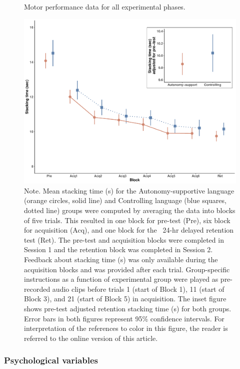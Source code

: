 \documentclass[doc,floatsintext,donotrepeattitle,letterpaper,12pt]{apa7}
\begin{document}
\begin{figure}[htbp]
    \caption{Motor performance data for all experimental phases.}
    \centering
    \includegraphics[scale=0.55]{../../figs/fig2.pdf}
    \setlength{\belowcaptionskip}{-2em}
    \caption*{\singlespacing \small Note. \normalfont Mean stacking time (s) for the Autonomy-supportive language (orange circles, solid line) and Controlling language (blue squares, dotted line) groups were computed by averaging the data into blocks of five trials. This resulted in one block for pre-test (Pre), six block for acquisition (Acq), and one block for the ~24-hr delayed retention test (Ret). The pre-test and acquisition blocks were completed in Session 1 and the retention block was completed in Session 2. Feedback about stacking time (s) was only available during the acquisition blocks and was provided after each trial. Group-specific instructions as a function of experimental group were played as pre-recorded audio clips before trials 1 (start of Block 1), 11 (start of Block 3), and 21 (start of Block 5) in acquisition. The inset figure shows pre-test adjusted retention stacking time (s) for both groups. Error bars in both figures represent 95\% confidence intervals. For interpretation of the references to color in this figure, the reader is referred to the online version of this article.}
    \label{fig:fig2}
\end{figure}

\clearpage

\subsubsection{Psychological variables}
\end{document}
